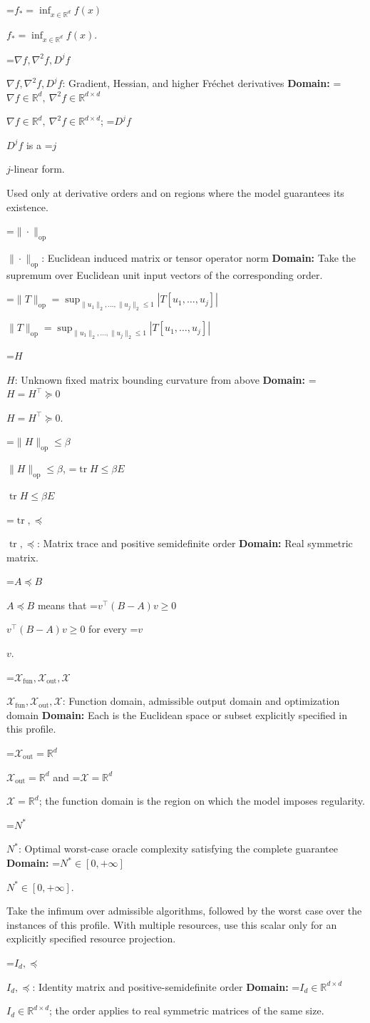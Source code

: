 \documentclass[10pt,a4paper]{article}
\newcommand{\AtlasMath}[1]{\par\begingroup\centering\setbox0=\hbox{$\displaystyle #1$}\ifdim\wd0>1.4\linewidth\typeout{ATLAS WIDE FORMULA: \the\wd0}\fi\ifdim\wd0>\linewidth\resizebox{\linewidth}{!}{\box0}\else\box0\fi\par\endgroup}
\newcommand{\AtlasInlineMath}[1]{\begingroup\setbox0=\hbox{$#1$}\ifdim\wd0>.4\linewidth\endgroup\AtlasMath{#1}\else\endgroup$#1$\fi}
\begin{document}
\AtlasInlineMath{f_*=\inf_{x\in \mathbb{R}^d}f(x)}.

\AtlasInlineMath{\nabla f,\nabla^2f,D^jf}: Gradient, Hessian, and higher Fréchet derivatives \textbf{Domain:} \AtlasInlineMath{\nabla f\in\mathbb{R}^d,\ \nabla^2f\in\mathbb{R}^{d\times d}}; \AtlasInlineMath{D^jf} is a \AtlasInlineMath{j}-linear form.

Used only at derivative orders and on regions where the model guarantees its existence.

\AtlasInlineMath{\|\cdot\|_{\mathrm{op}}}: Euclidean induced matrix or tensor operator norm \textbf{Domain:} Take the supremum over Euclidean unit input vectors of the corresponding order.

\AtlasInlineMath{\|T\|_{\mathrm{op}}=\sup_{\|u_1\|_2,\ldots,\|u_j\|_2\le1}|T[u_1,\ldots,u_j]|}

\AtlasInlineMath{H}: Unknown fixed matrix bounding curvature from above \textbf{Domain:} \AtlasInlineMath{H=H^\top\succeq0}.

\AtlasInlineMath{\|H\|_{\mathrm{op}}\le\beta}, \AtlasInlineMath{\operatorname{tr}H\le\beta E}

\AtlasInlineMath{\operatorname{tr},\preceq}: Matrix trace and positive semidefinite order \textbf{Domain:} Real symmetric matrix.

\AtlasInlineMath{A\preceq B} means that \AtlasInlineMath{v^\top(B-A)v\ge0} for every \AtlasInlineMath{v}.

\AtlasInlineMath{\mathcal{X}_{\mathrm{fun}},\mathcal{X}_{\mathrm{out}},\mathcal{X}}: Function domain, admissible output domain and optimization domain \textbf{Domain:} Each is the Euclidean space or subset explicitly specified in this profile.

\AtlasInlineMath{\mathcal{X}_{\mathrm{out}}=\mathbb{R}^d} and \AtlasInlineMath{\mathcal{X}=\mathbb{R}^d}; the function domain is the region on which the model imposes regularity.

\AtlasInlineMath{N^*}: Optimal worst-case oracle complexity satisfying the complete guarantee \textbf{Domain:} \AtlasInlineMath{N^*\in[0,+\infty]}.

Take the infimum over admissible algorithms, followed by the worst case over the instances of this profile. With multiple resources, use this scalar only for an explicitly specified resource projection.

\AtlasInlineMath{I_d,\preceq}: Identity matrix and positive-semidefinite order \textbf{Domain:} \AtlasInlineMath{I_d\in\mathbb{R}^{d\times d}}; the order applies to real symmetric matrices of the same size.
\end{document}
